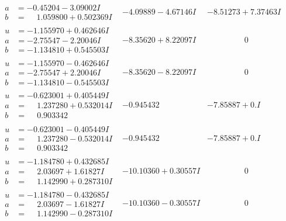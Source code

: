 \documentclass[1p]{elsarticle_modified}
\theoremstyle{definition}
\begin{document}
$$\begin{array}{c|c|c}
\begin{aligned}
a &= -0.45204 - 3.09002 I \\
b &= \phantom{-}1.059800 + 0.502369 I\end{aligned}
 & -4.09889 - 4.67146 I & -8.51273 + 7.37463 I \\ \hline\begin{aligned}
u &= -1.155970 + 0.462646 I \\
a &= -2.75547 - 2.20046 I \\
b &= -1.134810 + 0.545503 I\end{aligned}
 & -8.35620 + 8.22097 I & \phantom{-0.000000 } 0 \\ \hline\begin{aligned}
u &= -1.155970 - 0.462646 I \\
a &= -2.75547 + 2.20046 I \\
b &= -1.134810 - 0.545503 I\end{aligned}
 & -8.35620 - 8.22097 I & \phantom{-0.000000 } 0 \\ \hline\begin{aligned}
u &= -0.623001 + 0.405449 I \\
a &= \phantom{-}1.237280 + 0.532014 I \\
b &= \phantom{-}0.903342\phantom{ +0.000000I}\end{aligned}
 & -0.945432\phantom{ +0.000000I} & -7.85887 + 0. I\phantom{ +0.000000I} \\ \hline\begin{aligned}
u &= -0.623001 - 0.405449 I \\
a &= \phantom{-}1.237280 - 0.532014 I \\
b &= \phantom{-}0.903342\phantom{ +0.000000I}\end{aligned}
 & -0.945432\phantom{ +0.000000I} & -7.85887 + 0. I\phantom{ +0.000000I} \\ \hline\begin{aligned}
u &= -1.184780 + 0.432685 I \\
a &= \phantom{-}2.03697 + 1.61827 I \\
b &= \phantom{-}1.142990 + 0.287310 I\end{aligned}
 & -10.10360 + 0.30557 I & \phantom{-0.000000 } 0 \\ \hline\begin{aligned}
u &= -1.184780 - 0.432685 I \\
a &= \phantom{-}2.03697 - 1.61827 I \\
b &= \phantom{-}1.142990 - 0.287310 I\end{aligned}
 & -10.10360 - 0.30557 I & \phantom{-0.000000 } 0\\

\end{array}$$
\end{document}
